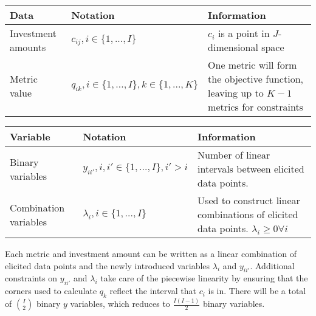 \documentclass[letterpaper,10pt,english]{sphinxmanual}
\begin{document}
\begin{savenotes}\sphinxattablestart
\centering
{}
\sphinxthecaptionisattop
{}\label{\detokenize{optimizers:table-2}}\label{\detokenize{optimizers:tbl-milpdat}}
\sphinxaftertopcaption
\begin{tabulary}{\linewidth}[t]{|T|T|T|}
\hline
\sphinxstyletheadfamily 
Data
&\sphinxstyletheadfamily 
Notation
&\sphinxstyletheadfamily 
Information
\\
\hline
Investment amounts
&
\(c_{ij}, i \in \{1, ..., I\}\)
&
\(c_i\) is a point in \(J\)-dimensional space
\\
\hline
Metric value
&
\(q_{ik}, i \in \{1, ..., I \}, k \in \{1, ..., K \}\)
&
One metric will form the objective function, leaving up to \(K-1\) metrics for constraints
\\
\hline
\end{tabulary}
\par
\sphinxattableend\end{savenotes}


\begin{savenotes}\sphinxattablestart
\centering
{}
\sphinxthecaptionisattop
{}\label{\detokenize{optimizers:table-3}}\label{\detokenize{optimizers:tbl-milpvar}}
\sphinxaftertopcaption
\begin{tabulary}{\linewidth}[t]{|T|T|T|}
\hline
\sphinxstyletheadfamily 
Variable
&\sphinxstyletheadfamily 
Notation
&\sphinxstyletheadfamily 
Information
\\
\hline
Binary variables
&
\(y_{ii'}, i, i' \in \{1, ..., I\}, i' > i\)
&
Number of linear intervals between elicited data points.
\\
\hline
Combination variables
&
\(\lambda_{i}, i \in \{1, ..., I\}\)
&
Used to construct linear combinations of elicited data points. \(\lambda_{i} \geq 0 \forall i\)
\\
\hline
\end{tabulary}
\par
\sphinxattableend\end{savenotes}

Each metric and investment amount can be written as a linear combination of elicited data points and the newly introduced variables \(\lambda_{i}\) and \(y_{ii'}\). Additional constraints on \(y_{ii'}\) and \(\lambda_{i}\) take care of the piecewise linearity by ensuring that the corners used to calculate \(q_k\) reflect the interval that \(c_i\) is in. There will be a total of \(\binom{I}{2}\) binary \(y\) variables, which reduces to \(\frac{I(I-1)}{2}\) binary variables.
\end{document}
